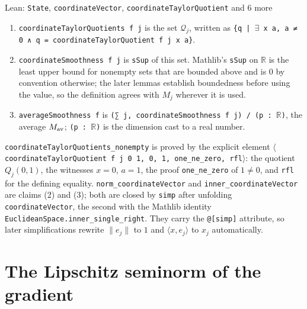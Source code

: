 \documentclass[11pt,a4paper]{article}
\begin{document}
\begin{leanbox}{Lean: \texttt{State}, \texttt{coordinateVector}, \texttt{coordinateTaylorQuotient} and 6 more}
\begin{enumerate}
\item \texttt{coordinate\allowbreak{}Taylor\allowbreak{}Quotients f j} is the set \(\mathcal Q_j\), written as \texttt{\{q | \ensuremath{\exists} x a, a ≠ 0 ∧ q = coordinate\allowbreak{}Taylor\allowbreak{}Quotient f j x a\}}.

\item \texttt{coordinate\allowbreak{}Smoothness f j} is \texttt{s\allowbreak{}Sup} of this set. Mathlib's \texttt{s\allowbreak{}Sup} on \(\mathbb R\) is the least upper bound for nonempty sets that are bounded above and is \(0\) by convention otherwise; the later lemmas establish boundedness before using the value, so the definition agrees with \(M_j\) wherever it is used.

\item \texttt{average\allowbreak{}Smoothness f} is \texttt{(∑ j, coordinate\allowbreak{}Smoothness f j) /\allowbreak{} (p : \ensuremath{\mathbb R})}, the average \(M_{\rm av}\); \texttt{(p : \ensuremath{\mathbb R})} is the dimension cast to a real number.

\end{enumerate}



\texttt{coordinate\allowbreak{}Taylor\allowbreak{}Quotients\_\allowbreak{}nonempty} is proved by the explicit element \texttt{\ensuremath{\langle}coordinate\allowbreak{}Taylor\allowbreak{}Quotient f j 0 1, 0, 1, one\_\allowbreak{}ne\_\allowbreak{}zero, rfl\ensuremath{\rangle}}: the quotient \(Q_j(0,1)\), the witnesses \(x=0\), \(a=1\), the proof \texttt{one\_\allowbreak{}ne\_\allowbreak{}zero} of \(1\ne0\), and \texttt{rfl} for the defining equality. \texttt{norm\_\allowbreak{}coordinate\allowbreak{}Vector} and \texttt{inner\_\allowbreak{}coordinate\allowbreak{}Vector} are claims (2) and (3); both are closed by \texttt{simp} after unfolding \texttt{coordinate\allowbreak{}Vector}, the second with the Mathlib identity \texttt{Euclidean\allowbreak{}Space.\allowbreak{}inner\_\allowbreak{}single\_\allowbreak{}right}. They carry the \texttt{@[simp]} attribute, so later simplifications rewrite \(\|e_j\|\) to \(1\) and \(\langle x,e_j\rangle\) to \(x_j\) automatically.
\end{leanbox}

\section{\texorpdfstring{The Lipschitz seminorm of the gradient}{The Lipschitz seminorm of the gradient}}
\end{document}
